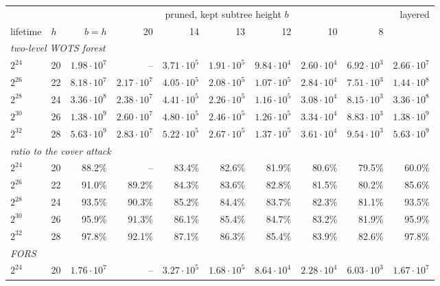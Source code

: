 \documentclass[11pt]{article}
\begin{document}
\begin{center}
\setlength{\tabcolsep}{3.5pt}
\small
\begin{tabular}{llrrrrrrrr}
  \toprule
  & & \multicolumn{7}{c}{pruned, kept subtree height $b$} & layered \\
  \cmidrule(lr){3-9}
  lifetime & $h$ & $b=h$ & 20 & 14 & 13 & 12 & 10 & 8 & \\
  \midrule
  \multicolumn{10}{l}{\emph{two-level WOTS forest}} \\
  $2^{24}$ & 20 & $1.98\cdot10^{7}$ & -- & $3.71\cdot10^{5}$ & $1.91\cdot10^{5}$ & $9.84\cdot10^{4}$ & $2.60\cdot10^{4}$ & $6.92\cdot10^{3}$ & $2.66\cdot10^{7}$ \\
  $2^{26}$ & 22 & $8.18\cdot10^{7}$ & $2.17\cdot10^{7}$ & $4.05\cdot10^{5}$ & $2.08\cdot10^{5}$ & $1.07\cdot10^{5}$ & $2.84\cdot10^{4}$ & $7.51\cdot10^{3}$ & $1.44\cdot10^{8}$ \\
  $2^{28}$ & 24 & $3.36\cdot10^{8}$ & $2.38\cdot10^{7}$ & $4.41\cdot10^{5}$ & $2.26\cdot10^{5}$ & $1.16\cdot10^{5}$ & $3.08\cdot10^{4}$ & $8.15\cdot10^{3}$ & $3.36\cdot10^{8}$ \\
  $2^{30}$ & 26 & $1.38\cdot10^{9}$ & $2.60\cdot10^{7}$ & $4.80\cdot10^{5}$ & $2.46\cdot10^{5}$ & $1.26\cdot10^{5}$ & $3.34\cdot10^{4}$ & $8.83\cdot10^{3}$ & $1.38\cdot10^{9}$ \\
  $2^{32}$ & 28 & $5.63\cdot10^{9}$ & $2.83\cdot10^{7}$ & $5.22\cdot10^{5}$ & $2.67\cdot10^{5}$ & $1.37\cdot10^{5}$ & $3.61\cdot10^{4}$ & $9.54\cdot10^{3}$ & $5.63\cdot10^{9}$ \\
  \midrule
  \multicolumn{10}{l}{\emph{ratio to the cover attack}} \\
  $2^{24}$ & 20 & 88.2\% & -- & 83.4\% & 82.6\% & 81.9\% & 80.6\% & 79.5\% & 60.0\% \\
  $2^{26}$ & 22 & 91.0\% & 89.2\% & 84.3\% & 83.6\% & 82.8\% & 81.5\% & 80.2\% & 85.6\% \\
  $2^{28}$ & 24 & 93.5\% & 90.3\% & 85.2\% & 84.4\% & 83.7\% & 82.3\% & 81.1\% & 93.5\% \\
  $2^{30}$ & 26 & 95.9\% & 91.3\% & 86.1\% & 85.4\% & 84.7\% & 83.2\% & 81.9\% & 95.9\% \\
  $2^{32}$ & 28 & 97.8\% & 92.1\% & 87.1\% & 86.3\% & 85.4\% & 83.9\% & 82.6\% & 97.8\% \\
  \midrule
  \multicolumn{10}{l}{\emph{FORS}} \\
  $2^{24}$ & 20 & $1.76\cdot10^{7}$ & -- & $3.27\cdot10^{5}$ & $1.68\cdot10^{5}$ & $8.64\cdot10^{4}$ & $2.28\cdot10^{4}$ & $6.03\cdot10^{3}$ & $1.67\cdot10^{7}$ \\

\end{tabular}
\end{center}
\end{document}
